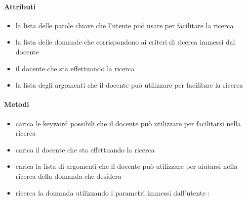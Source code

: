 \paragraph{Attributi}
\begin{itemize}
\item {}
\newline
la lista delle parole chiave che l'utente può usare per facilitare la ricerca
\item {}
\newline
la lista delle domande che corrispondono ai criteri di ricerca immessi dal docente
\item {}
\newline
il docente che sta effettuando la ricerca
\item {}
\newline
la lista degli argomenti che il docente può utilizzare per facilitare la ricerca
\end{itemize}
\paragraph{Metodi}
\begin{itemize}
\item {}
\newline
carica le keyword possibili che il docente può utilizzare per facilitarsi nella ricerca
\newline
\item {}
\newline
carica il docente che sta effettuando la ricerca
\newline
\item {}
\newline
carica la lista di argomenti che il docente può utilizzare per aiutarsi nella ricerca della domanda che desidera
\newline
\item {}
\newline
ricerca la domanda utilizzando i parametri immessi dall'utente
\newline
{} :
\end{itemize}
